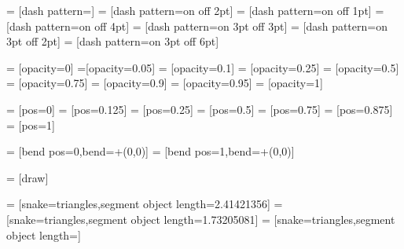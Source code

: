 =                   [dash pattern=]
=                  [dash pattern=on \pgflinewidth off 2pt]
=          [dash pattern=on \pgflinewidth off 1pt]
=          [dash pattern=on \pgflinewidth off 4pt]
=                  [dash pattern=on 3pt off 3pt]
=          [dash pattern=on 3pt off 2pt]
=          [dash pattern=on 3pt off 6pt]

=             [opacity=0]
=[opacity=0.05]
= [opacity=0.1]
=      [opacity=0.25]
=         [opacity=0.5]
=           [opacity=0.75]
=      [opacity=0.9]
=     [opacity=0.95]
=                  [opacity=1]

=                [pos=0]
=         [pos=0.125]
=              [pos=0.25]
=                  [pos=0.5]
=                [pos=0.75]
=           [pos=0.875]
=                  [pos=1]

=           [bend pos=0,bend={+(0,0)}]
=             [bend pos=1,bend={+(0,0)}]

=        [draw]

=      [snake=triangles,segment object length=2.41421356\pgfsnakesegmentamplitude]
=      [snake=triangles,segment object length=1.73205081\pgfsnakesegmentamplitude]
=      [snake=triangles,segment object length=\pgfsnakesegmentamplitude]


%
%

\let\tikz@late@keys=\pgfutil@empty%

\def\tikz@set@one@key#1{%
  \tikz@orig@setkeys*{tikz}{#1}%
  \ifx\XKV@rm\pgfutil@empty%
  \else%
    \expandafter\pgfutil@in@\expandafter!\expandafter{\XKV@rm}%
    \ifpgfutil@in@%
      \expandafter\tikz@addoption\expandafter{\expandafter\pgfutil@color\expandafter{\XKV@rm}}%
      \edef\tikz@textcolor{\XKV@rm}%
    \else%
      \pgfutil@doifcolorelse{\XKV@rm}
      { %
        \expandafter\tikz@addoption\expandafter{\expandafter\pgfutil@color\expandafter{\XKV@rm}}%
        \edef\tikz@textcolor{\XKV@rm}%
      }%
      {%
        \expandafter\pgfutil@in@\expandafter-\expandafter{\XKV@rm}
        \ifpgfutil@in@%
          \expandafter\tikz@processarrows\expandafter{\XKV@rm}%
        \else%
          \expandafter\ifx\csname pgf@sh@s@\XKV@rm\endcsname\relax%
            \PackageError{tikz}{I do not know what to do with the option ``\XKV@rm''}{}
          \else%
            \edef\tikz@shape{\XKV@rm}%
          \fi%
        \fi%
      }%
    \fi%
  \fi%
}

